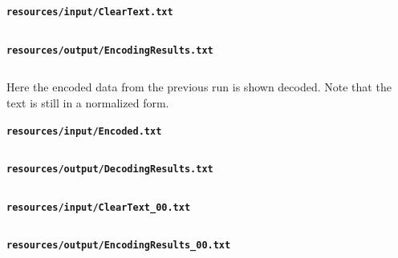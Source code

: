\documentclass[10pt,letterpaper,final]{report}
\begin{document}
\inputminted[breaklines, breakanywhere, fontsize=\footnotesize, frame=single, fontsize=\footnotesize]{text}{resources/demo.txt}

\begin{landscape}
\begin{center}
  \begin{minipage}[t]{0.6\textwidth}
    \centering
    \textbf{\texttt{resources/input/ClearText.txt}}\\
    \inputminted[linenos, breaklines, breakanywhere, frame=single,fontsize=\footnotesize]{text}{resources/input/ClearText.txt}
  \end{minipage}\hfill
  \begin{minipage}[t]{0.6\textwidth}
    \centering
    \textbf{\texttt{resources/output/EncodingResults.txt}}\\
    \inputminted[linenos, breaklines, breakanywhere, fontsize=\footnotesize, frame=single, fontsize=\footnotesize]{text}{resources/output/EncodingResults.txt}
  \end{minipage}
\end{center}

Here the encoded data from the previous run is shown decoded. Note that the text is still in a normalized form.

\begin{center}
  \begin{minipage}[t]{0.6\textwidth}
    \centering
    \textbf{\texttt{resources/input/Encoded.txt}}\\
    \inputminted[linenos, breaklines, breakanywhere, frame=single,fontsize=\footnotesize]{text}{resources/input/Encoded.txt}
  \end{minipage}\hfill
  \begin{minipage}[t]{0.6\textwidth}
    \centering
    \textbf{\texttt{resources/output/DecodingResults.txt}}\\
    \inputminted[linenos, breaklines, breakanywhere, fontsize=\footnotesize, frame=single, fontsize=\footnotesize]{text}{resources/output/DecodingResults.txt}
  \end{minipage}
\end{center}

\pagebreak

\begin{center}
  \begin{minipage}[t]{0.6\textwidth}
    \centering
    \textbf{\texttt{resources/input/ClearText_00.txt}}\\
    \inputminted[linenos, breaklines, breakanywhere, frame=single,fontsize=\footnotesize]{text}{resources/input/ClearText_00.txt}
  \end{minipage}\hfill
  \begin{minipage}[t]{0.6\textwidth}
    \centering
    \textbf{\texttt{resources/output/EncodingResults_00.txt}}\\
    \inputminted[linenos, breaklines, breakanywhere, fontsize=\footnotesize, frame=single, fontsize=\footnotesize]{text}{resources/output/EncodingResults_00.txt}
  \end{minipage}
\end{center}


\end{landscape}
\end{document}
